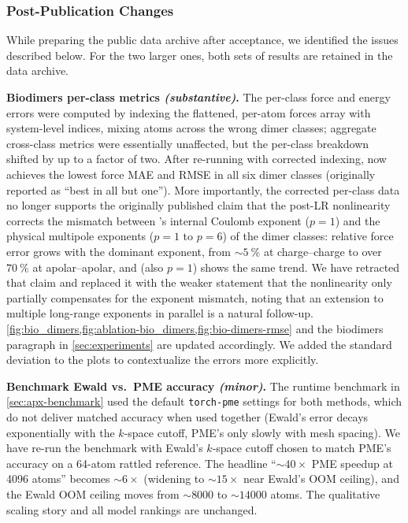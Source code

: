 \documentclass[10pt]{article}
\begin{document}
\subsubsection*{Post-Publication Changes}

While preparing the public data archive after acceptance, we identified the issues described below. For the two larger ones, both sets of results are retained in the data archive.

\textbf{Biodimers per-class metrics \emph{(substantive)}.} The per-class force and energy errors were computed by indexing the flattened, per-atom forces array with system-level indices, mixing atoms across the wrong dimer classes; aggregate cross-class metrics were essentially unaffected, but the per-class breakdown shifted by up to a factor of two. After re-running with corrected indexing, \lorem now achieves the lowest force MAE and RMSE in all six dimer classes (originally reported as ``best in all but one''). More importantly, the corrected per-class data no longer supports the originally published claim that the post-LR nonlinearity corrects the mismatch between \lorem's internal Coulomb exponent ($p=1$) and the physical multipole exponents ($p=1$ to $p=6$) of the dimer classes: relative force error grows with the dominant exponent, from $\sim\qty{5}{\percent}$ at charge--charge to over $\qty{70}{\percent}$ at apolar--apolar, and \cace (also $p=1$) shows the same trend. We have retracted that claim and replaced it with the weaker statement that the nonlinearity only partially compensates for the exponent mismatch, noting that an extension to multiple long-range exponents in parallel is a natural follow-up. \cref{fig:bio_dimers,fig:ablation-bio_dimers,fig:bio-dimers-rmse} and the biodimers paragraph in \cref{sec:experiments} are updated accordingly. We added the standard deviation to the plots to contextualize the errors more explicitly.

\textbf{Benchmark Ewald vs.\ PME accuracy \emph{(minor)}.} The runtime benchmark in \cref{sec:apx-benchmark} used the default \texttt{torch-pme} settings for both methods, which do not deliver matched accuracy when used together (Ewald's error decays exponentially with the $k$-space cutoff, PME's only slowly with mesh spacing). We have re-run the benchmark with Ewald's $k$-space cutoff chosen to match PME's accuracy on a 64-atom rattled  reference. The headline ``$\sim\!40\times$ PME speedup at \num{4096} atoms'' becomes $\sim\!6\times$ (widening to $\sim\!15\times$ near Ewald's OOM ceiling), and the Ewald OOM ceiling moves from $\sim\!\num{8000}$ to $\sim\!\num{14000}$ atoms. The qualitative scaling story and all model rankings are unchanged.
\end{document}

